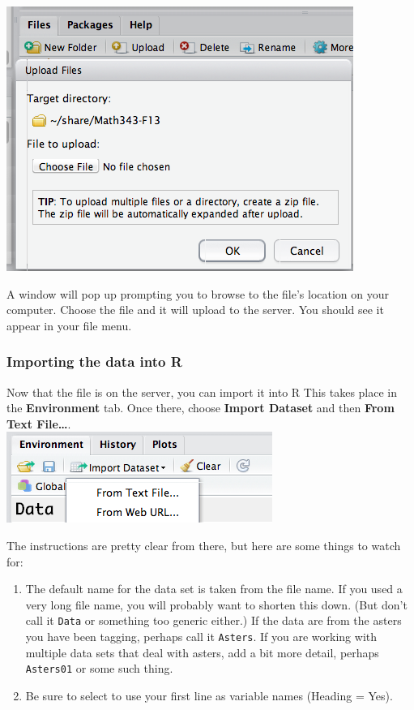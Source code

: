 \documentclass[]{book}
\providecommand{\tightlist}{%
  \setlength{\itemsep}{0pt}\setlength{\parskip}{0pt}}
\begin{document}
\includegraphics{images/Upload.png}

A window will pop up prompting you to browse to the file's location on your computer. Choose the file and it will upload to the server. You should see it appear in your file menu.

\hypertarget{importing-the-data-into-r}{%
\subsubsection{Importing the data into R}\label{importing-the-data-into-r}}

Now that the file is on the server, you can import it into R This takes place in the \textbf{Environment} tab. Once there, choose \textbf{Import Dataset} and then \textbf{From Text File\ldots{}}.\\
\includegraphics{images/Import1.png}

The instructions are pretty clear from there, but here are some things to watch for:

\begin{enumerate}
\tightlist
\item
  The default name for the data set is taken from the file name. If you used a very long file name, you will probably want to shorten this down. (But don't call it \texttt{Data} or something too generic either.) If the data are from the asters you have been tagging, perhaps call it \texttt{Asters}. If you are working with multiple data sets that deal with asters, add a bit more detail, perhaps \texttt{Asters01} or some such thing.
\item
  Be sure to select to use your first line as variable names (Heading = Yes).
\end{enumerate}
\end{document}
